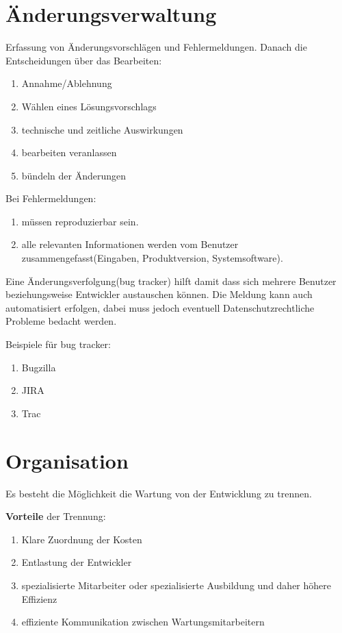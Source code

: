 \documentclass[a4paper]{article}
\theoremstyle{break}
\begin{document}
\section{Änderungsverwaltung}
Erfassung von Änderungsvorschlägen und Fehlermeldungen. Danach die Entscheidungen über das Bearbeiten:
\begin{enumerate}
\item Annahme/Ablehnung
\item Wählen eines Lösungsvorschlags
\item technische und zeitliche Auswirkungen
\item bearbeiten veranlassen
\item bündeln der Änderungen
\end{enumerate}

Bei Fehlermeldungen:
\begin{enumerate}
\item müssen reproduzierbar sein.
\item alle relevanten Informationen werden vom Benutzer zusammengefasst(Eingaben, Produktversion, Systemsoftware).
\end{enumerate}

Eine Änderungsverfolgung(bug tracker) hilft damit dass sich mehrere Benutzer beziehungsweise Entwickler austauschen können. Die Meldung kann auch automatisiert erfolgen, dabei muss jedoch eventuell Datenschutzrechtliche Probleme bedacht werden.

Beispiele für bug tracker:
\begin{enumerate}
\item Bugzilla
\item JIRA
\item Trac
\end{enumerate}


\section{Organisation}
Es besteht die Möglichkeit die Wartung von der Entwicklung zu trennen.

\textbf{Vorteile} der Trennung:
\begin{enumerate}
\item Klare Zuordnung der Kosten
\item Entlastung der Entwickler
\item spezialisierte Mitarbeiter oder spezialisierte Ausbildung und daher höhere Effizienz
\item effiziente Kommunikation zwischen Wartungsmitarbeitern
\end{enumerate}
\end{document}
